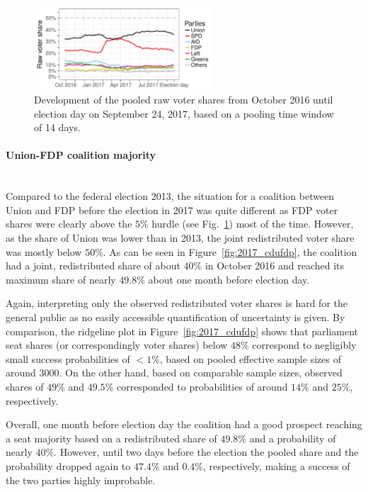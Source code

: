 \documentclass[smallcondensed]{svjour3}     %
\begin{document}
\begin{figure}[H]\centering
\includegraphics[width=0.6\textwidth]{figures/2017_pooled_rawShares.pdf}
\caption{Development of the pooled raw voter shares from October 2016 until
election day on September 24, 2017, based on a pooling time window of 14 days.
\label{fig:2017}
}
\end{figure}


\paragraph{Union-FDP coalition majority} \ \\
Compared to the federal election 2013, the situation for a
coalition between Union and FDP before the election in 2017
was quite different as FDP voter shares were
clearly above the $5\%$ hurdle (see Fig.~\ref{fig:2017}) most of the time.
However, as the share of Union was lower than in 2013,
the joint redistributed voter share was mostly below $50\%$.
As can be seen in Figure~\ref{fig:2017_cdufdp}, the coalition had
a joint, redistributed share of about $40\%$ in October 2016
and reached its maximum share of nearly $49.8\%$ about one month
before election day.

Again, interpreting only the observed redistributed voter shares
is hard for the general public as no easily accessible quantification
of uncertainty is given. By comparison, the ridgeline plot in Figure~\ref{fig:2017_cdufdp}
shows that parliament seat shares (or correspondingly voter shares)
below $48\%$ correspond to negligibly small success probabilities
of $<1\%$, based on pooled effective sample sizes of around $3000$.
On the other hand, based on comparable sample sizes, observed shares of $49\%$
and $49.5\%$ corresponded to probabilities of around $14\%$ and $25\%$,
respectively.

Overall, one month before election day the coalition had a good prospect
reaching a seat majority based on a redistributed share of $49.8\%$ and
a probability of nearly $40\%$.
However, until two days before the election the pooled share and the probability
dropped again to $47.4\%$ and $0.4\%$, respectively, making a success
of the two parties highly improbable.
\end{document}
